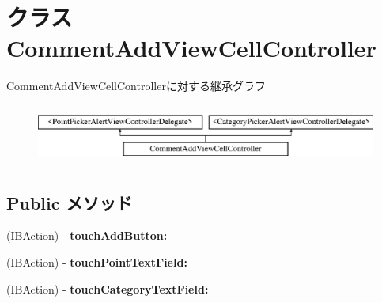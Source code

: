 \hypertarget{interface_comment_add_view_cell_controller}{
\section{クラス CommentAddViewCellController}
\label{interface_comment_add_view_cell_controller}
}
CommentAddViewCellControllerに対する継承グラフ\begin{figure}[H]
\begin{center}
\leavevmode
\includegraphics[height=1.978799cm]{interface_comment_add_view_cell_controller}
\end{center}
\end{figure}
\subsection*{Public メソッド}
\begin{DoxyCompactItemize}
\item 
\hypertarget{interface_comment_add_view_cell_controller_afe532e3d7df727964275d2ac91060ccb}{
(IBAction) -\/ {\bfseries touchAddButton:}}
\label{interface_comment_add_view_cell_controller_afe532e3d7df727964275d2ac91060ccb}

\item 
\hypertarget{interface_comment_add_view_cell_controller_a513ed5171ca3b8ff13b6fff41d16882c}{
(IBAction) -\/ {\bfseries touchPointTextField:}}
\label{interface_comment_add_view_cell_controller_a513ed5171ca3b8ff13b6fff41d16882c}

\item 
\hypertarget{interface_comment_add_view_cell_controller_a9e404058ea5227904b4289b616dfe307}{
(IBAction) -\/ {\bfseries touchCategoryTextField:}}
\label{interface_comment_add_view_cell_controller_a9e404058ea5227904b4289b616dfe307}

\end{DoxyCompactItemize}
